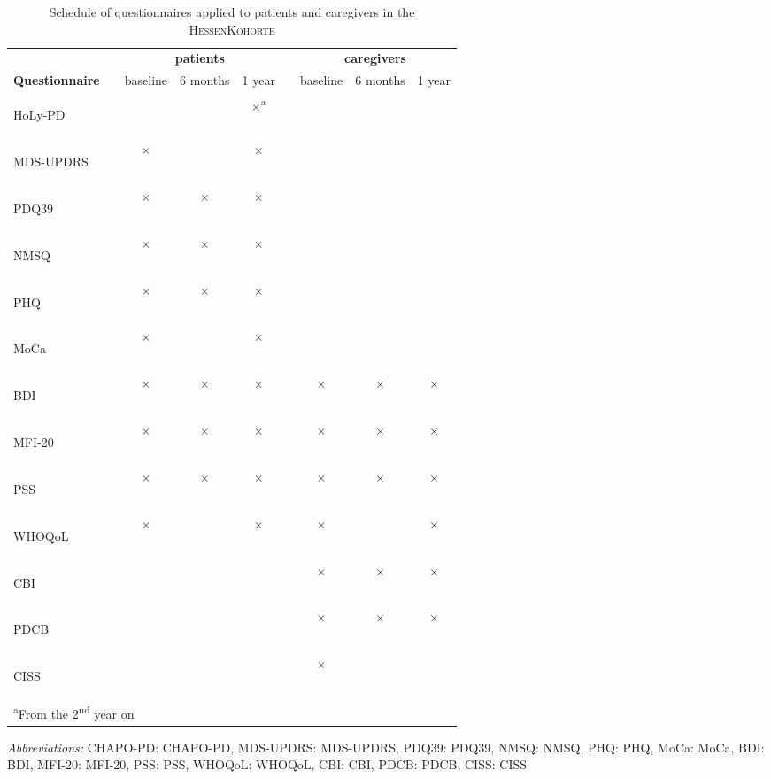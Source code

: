 \newcommand{\FC}{$\times$}
\newcommand{\FCa}{\textsuperscript{\phantom{a}}\FC{}\textsuperscript{a}}
\newcommand{\emC}{}
\newcommand{\acb}[1]{\acs{#1}: \acl{#1}}
\newcommand{\acv}[1]{\begin{NoHyper}\acs{#1}\end{NoHyper}}
\begin{table}[H]
\begin{tabular}{lcccccccc}
\caption{Schedule of questionnaires applied to patients and caregivers in the \textsc{HessenKohorte}}
\label{tab:questionnaireSchedule}\\
\textbf{} & & \multicolumn{3}{c}{\textbf{patients}} & & \multicolumn{3}{c}{\textbf{caregivers}} \\[1em]
\textbf{Questionnaire}& & baseline & 6 months & 1 year  & & baseline   & 6 months & 1 year \\[1em]
\acv{HoLy-PD}         & & \emC{}   & \emC{}   & \FCa{}  & & \emC{} & \emC{}   & \emC{} \\
\acv{MDS-UPDRS}       & & \FC{}    & \emC{}   & \FC{}   & & \emC{} & \emC{}   & \emC{} \\
\acv{PDQ39}           & & \FC{}    & \FC{}    & \FC{}   & & \emC{} & \emC{}   & \emC{} \\
\acv{NMSQ}            & & \FC{}    & \FC{}    & \FC{}   & & \emC{} & \emC{}   & \emC{} \\
\acv{PHQ}             & & \FC{}    & \FC{}    & \FC{}   & & \emC{} & \emC{}   & \emC{} \\
\acv{MoCa}            & & \FC{}    & \emC{}   & \FC{}   & & \emC{} & \emC{}   & \emC{} \\
\acv{BDI}             & & \FC{}    & \FC{}    & \FC{}   & & \FC{}  & \FC{}    & \FC{}  \\
\acv{MFI-20}          & & \FC{}    & \FC{}    & \FC{}   & & \FC{}  & \FC{}    & \FC{}  \\
\acv{PSS}             & & \FC{}    & \FC{}    & \FC{}   & & \FC{}  & \FC{}    & \FC{}  \\ 
\acv{WHOQoL}          & & \FC{}    & \emC{}   & \FC{}   & & \FC{}  & \emC{}   & \FC{}  \\
\acv{CBI}             & & \emC{}   & \emC{}   & \emC{}  & & \FC{}  & \FC{}    & \FC{}  \\
\acv{PDCB}            & & \emC{}   & \emC{}   & \emC{}  & & \FC{}  & \FC{}    & \FC{}  \\                              
\acv{CISS}            & & \emC{}   & \emC{}   & \emC{}  & & \FC{}  & \emC{}   & \emC{} \\
\bottomrule
\multicolumn{9}{l}{\footnotesize{\textsuperscript{a}From the 2\textsuperscript{nd} year on}} \\
\end{tabular}

\bigskip
\footnotesize{\textit{Abbreviations:} \acb{CHAPO-PD}, \acb{MDS-UPDRS}, \acb{PDQ39}, \acb{NMSQ}, \acb{PHQ},
\acb{MoCa}, \acb{BDI}, \acb{MFI-20}, \acb{PSS}, \acb{WHOQoL}, \acb{CBI}, \acb{PDCB}, \acb{CISS}}
\end{table}
